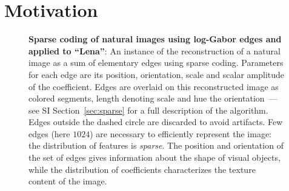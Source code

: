 \documentclass{article}
\title{\Title}
\begin{document}
\if{}
\doublespacing
\fi

%
\maketitle
%
\begin{abstract}
\Abstract
\end{abstract}
%
\begin{keywords}
\Keywords
\end{keywords}
%

\section{Motivation}
\begin{figure}[ht!]%
\caption{
{\bf Sparse coding of natural images using log-Gabor edges and applied to ``Lena''}:
An instance of the reconstruction of a natural image as a sum of elementary edges using sparse coding. Parameters for each edge are its position, orientation, scale and scalar amplitude of the coefficient. Edges are overlaid on this reconstructed image as colored segments, length denoting scale and hue the orientation\if{}\ --- see SI Section~\ref{sec:sparse} for a full description of the algorithm\fi. Edges outside the dashed circle are discarded to avoid artifacts. Few edges (here $1024$) are necessary to efficiently represent the image: the distribution of features is \emph{sparse}. The position and orientation of the set of edges gives information about the shape of visual objects, while the distribution of coefficients characterizes the texture content of the image.
\label{fig:EUVIP_lena}}%
\end{figure}%
\end{document}
